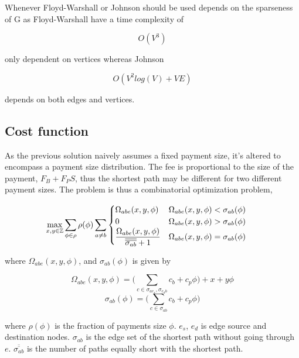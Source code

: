 Whenever Floyd-Warshall or Johnson should be used depends on the sparseness of G as Floyd-Warshall have a time complexity of

\[ O(V^3) \]

only dependent on vertices whereas Johnson

\[ O(V^2 log(V) + VE ) \]

depends on both edges and vertices. 

\subsection{Cost function}

As the previous solution naively assumes a fixed payment size, it's altered to encompass a payment size distribution.
The fee is proportional to the size of the payment, $F_B + F_P S$, thus the shortest path may be different for two different payment sizes. 
The problem is thus a combinatorial optimization problem,

\begin{equation*}
\hspace*{-0.5cm}	\max_{ x,y \in \mathbb{Z} } \sum_{\phi\in \rho} \rho(\phi) \sum_{a \neq b}
	\begin{cases}
	\Omega_{abe}(x, y, \phi) & \Omega_{abe}(x, y, \phi) < \sigma_{ab}(\phi)  \\
	0 & \Omega_{abe}(x, y, \phi) > \sigma_{ab}(\phi) \\
	\dfrac{\Omega_{abe}(x, y, \phi)}{\overline{\overline{\sigma_{ab}}} + 1} & \Omega_{abe}(x, y, \phi) = \sigma_{ab}(\phi)  \\
	\end{cases}
\end{equation*}

where $\Omega_{abe}(x, y, \phi)$, and $\sigma_{ab}(\phi)$ is given by

\begin{equation*}	
	\Omega_{abe}(x, y, \phi) = \Bigg( \sum_{c \in \sigma_{ae_s},\sigma_{e_db}} c_b + c_p\phi \Bigg) +
	x + y\phi 
\end{equation*}
\begin{equation*}
	\sigma_{ab}(\phi) = \Bigg( \sum_{c \in \sigma_{ab}} c_b + c_p\phi \Bigg)
\end{equation*}

where $\rho(\phi)$ is the fraction of payments size $\phi$. $e_s$, $e_d$ is edge source and destination nodes. $\sigma_{ab}$ is the edge set of the shortest path without going through $e$. $\overline{\overline{\sigma_{ab}}}$ is the number of paths equally short with the shortest path.

